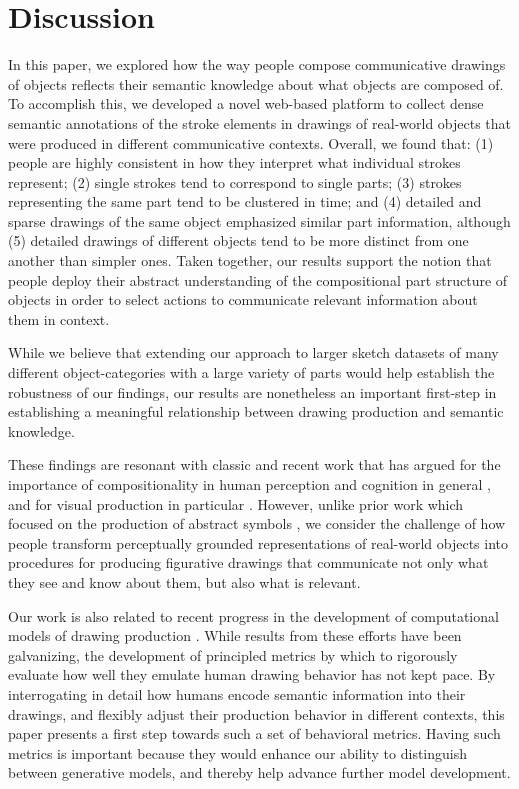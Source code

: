 \documentclass[10pt,letterpaper]{article}
\begin{document}
\section{Discussion}

In this paper, we explored how the way people compose communicative drawings of objects reflects their semantic knowledge about what objects are composed of. 
To accomplish this, we developed a novel web-based platform to collect dense semantic annotations of the stroke elements in drawings of real-world objects that were produced in different communicative contexts. 
Overall, we found that: (1) people are highly consistent in how they interpret what individual strokes represent; (2) single strokes tend to correspond to single parts; (3) strokes representing the same part tend to be clustered in time; and (4) detailed and sparse drawings of the same object emphasized similar part information, although (5) detailed drawings of different objects tend to be more distinct from one another than simpler ones. 
Taken together, our results support the notion that people deploy their abstract understanding of the compositional part structure of objects in order to select actions to communicate relevant information about them in context.  

While we believe that extending our approach to larger sketch datasets of many different object-categories with a large variety of parts would help establish the robustness of our findings, our results are nonetheless an important first-step in establishing a meaningful relationship between drawing production and semantic knowledge.

These findings are resonant with classic and recent work that has argued for the importance of compositionality in human perception and cognition in general \cite{biederman1987recognition, battaglia2018relational,lake2017building}, and for visual production in particular \cite{lake2015human}. 
However, unlike prior work which focused on the production of abstract symbols \cite{lake2015human}, we consider the challenge of how people transform perceptually grounded representations of real-world objects into procedures for producing figurative drawings that communicate not only what they see and know about them, but also what is relevant. 

Our work is also related to recent progress in the development of computational models of drawing production \cite{ha2017neural,li2019photo}. 
While results from these efforts have been galvanizing, the development of principled metrics by which to rigorously evaluate how well they emulate human drawing behavior has not kept pace. 
By interrogating in detail how humans encode semantic information into their drawings, and flexibly adjust their production behavior in different contexts, this paper presents a first step towards such a set of behavioral metrics.
Having such metrics is important because they would enhance our ability to distinguish between generative models, and thereby help advance further model development. 
\end{document}
